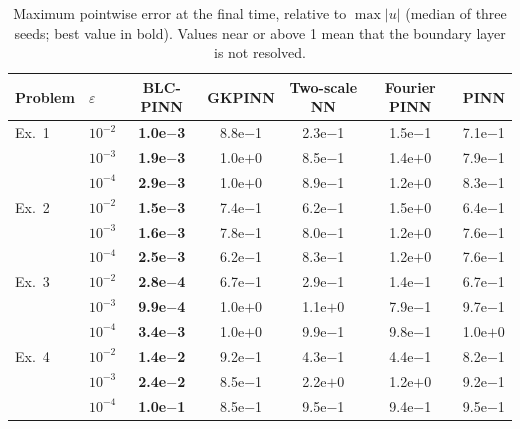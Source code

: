 \begin{table}[!htb]
\centering\small
\setlength{\tabcolsep}{3.5pt}
\caption{Maximum pointwise error at the final time, relative to $\max|u|$ (median of three seeds; best value in bold). Values near or above 1 mean that the boundary layer is not resolved.}
\label{tab:main-linf}
\begin{tabular}{llccccc}
\toprule
Problem & $\varepsilon$ & BLC-PINN & GKPINN & Two-scale NN & Fourier PINN & PINN \\
\midrule
Ex.~1 & $10^{-2}$ & \textbf{1.0e$-$3} & 8.8e$-$1 & 2.3e$-$1 & 1.5e$-$1 & 7.1e$-$1 \\
 & $10^{-3}$ & \textbf{1.9e$-$3} & 1.0e$+$0 & 8.5e$-$1 & 1.4e$+$0 & 7.9e$-$1 \\
 & $10^{-4}$ & \textbf{2.9e$-$3} & 1.0e$+$0 & 8.9e$-$1 & 1.2e$+$0 & 8.3e$-$1 \\
\addlinespace
Ex.~2 & $10^{-2}$ & \textbf{1.5e$-$3} & 7.4e$-$1 & 6.2e$-$1 & 1.5e$+$0 & 6.4e$-$1 \\
 & $10^{-3}$ & \textbf{1.6e$-$3} & 7.8e$-$1 & 8.0e$-$1 & 1.2e$+$0 & 7.6e$-$1 \\
 & $10^{-4}$ & \textbf{2.5e$-$3} & 6.2e$-$1 & 8.3e$-$1 & 1.2e$+$0 & 7.6e$-$1 \\
\addlinespace
Ex.~3 & $10^{-2}$ & \textbf{2.8e$-$4} & 6.7e$-$1 & 2.9e$-$1 & 1.4e$-$1 & 6.7e$-$1 \\
 & $10^{-3}$ & \textbf{9.9e$-$4} & 1.0e$+$0 & 1.1e$+$0 & 7.9e$-$1 & 9.7e$-$1 \\
 & $10^{-4}$ & \textbf{3.4e$-$3} & 1.0e$+$0 & 9.9e$-$1 & 9.8e$-$1 & 1.0e$+$0 \\
\addlinespace
Ex.~4 & $10^{-2}$ & \textbf{1.4e$-$2} & 9.2e$-$1 & 4.3e$-$1 & 4.4e$-$1 & 8.2e$-$1 \\
 & $10^{-3}$ & \textbf{2.4e$-$2} & 8.5e$-$1 & 2.2e$+$0 & 1.2e$+$0 & 9.2e$-$1 \\
 & $10^{-4}$ & \textbf{1.0e$-$1} & 8.5e$-$1 & 9.5e$-$1 & 9.4e$-$1 & 9.5e$-$1 \\
\bottomrule
\end{tabular}
\end{table}

